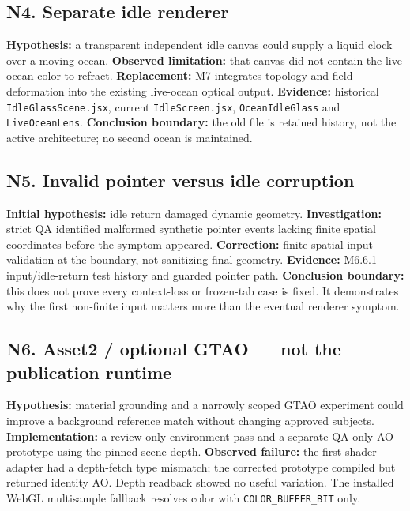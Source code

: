 \documentclass[
  english,
  11pt,
]{article}
\begin{document}
\subsection{N4. Separate idle
renderer}\label{n4.-separate-idle-renderer}

\textbf{Hypothesis:} a transparent independent idle canvas could supply
a liquid clock over a moving ocean. \textbf{Observed limitation:} that
canvas did not contain the live ocean color to refract.
\textbf{Replacement:} M7 integrates topology and field deformation into
the existing live-ocean optical output. \textbf{Evidence:} historical
\texttt{IdleGlassScene.jsx}, current \texttt{IdleScreen.jsx},
\texttt{OceanIdleGlass} and \texttt{LiveOceanLens}. \textbf{Conclusion
boundary:} the old file is retained history, not the active
architecture; no second ocean is maintained.

\subsection{N5. Invalid pointer versus idle
corruption}\label{n5.-invalid-pointer-versus-idle-corruption}

\textbf{Initial hypothesis:} idle return damaged dynamic geometry.
\textbf{Investigation:} strict QA identified malformed synthetic pointer
events lacking finite spatial coordinates before the symptom appeared.
\textbf{Correction:} finite spatial-input validation at the boundary,
not sanitizing final geometry. \textbf{Evidence:} M6.6.1
input/idle-return test history and guarded pointer path.
\textbf{Conclusion boundary:} this does not prove every context-loss or
frozen-tab case is fixed. It demonstrates why the first non-finite input
matters more than the eventual renderer symptom.

\subsection{N6. Asset2 / optional GTAO --- not the publication
runtime}\label{n6.-asset2-optional-gtao-not-the-publication-runtime}

\textbf{Hypothesis:} material grounding and a narrowly scoped GTAO
experiment could improve a background reference match without changing
approved subjects. \textbf{Implementation:} a review-only environment
pass and a separate QA-only AO prototype using the pinned scene depth.
\textbf{Observed failure:} the first shader adapter had a depth-fetch
type mismatch; the corrected prototype compiled but returned identity
AO. Depth readback showed no useful variation. The installed WebGL
multisample fallback resolves color with \texttt{COLOR\_BUFFER\_BIT}
only.
\end{document}
